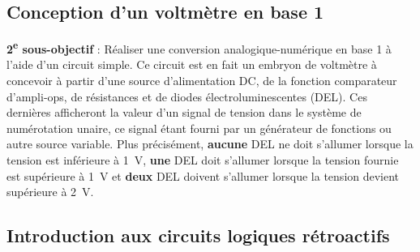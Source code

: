 \documentclass[canadien,12pt,oneside,letterpaper]{article}
\begin{document}
\subsection{Conception d'un voltmètre en base 1}

\noindent\textbf{2\textsuperscript{e} sous-objectif} : Réaliser une conversion analogique-numérique en base 1 à l'aide d'un circuit simple. Ce circuit est en fait un embryon de voltmètre à concevoir à partir d'une source d'alimentation DC, de la fonction comparateur d'ampli-ops, de résistances et de diodes électroluminescentes (DEL). Ces dernières afficheront la valeur d'un signal de tension dans le système de numérotation unaire, ce signal étant fourni par un générateur de fonctions ou autre source variable. Plus précisément, \textbf{aucune} DEL ne doit s'allumer lorsque la tension est inférieure à 1~V, \textbf{une} DEL doit s'allumer lorsque la tension fournie est supérieure à 1~V et \textbf{deux} DEL doivent s'allumer lorsque la tension devient supérieure à 2~V.

\subsection{Introduction aux circuits logiques rétroactifs}



\end{document}
